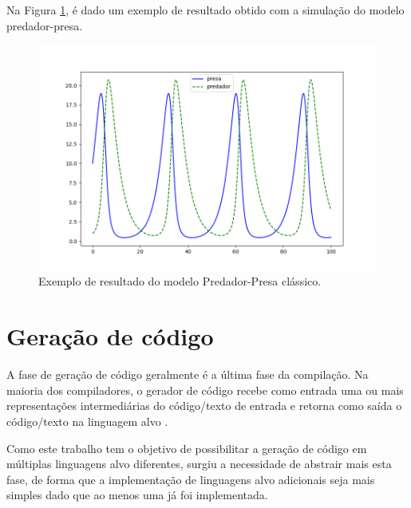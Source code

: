 \documentclass[
	12pt,				%
	openright,			%
	oneside,			%
	a4paper,			%
	main=brazil,
	english,			%
	]{ufsj-abntex2}
\begin{document}
Na Figura \ref{fig:hostprey}, é dado um exemplo de resultado obtido com a simulação do modelo predador-presa. 

\begin{figure}[h]
    \centering
    \includegraphics[scale=0.6]{imgs/hostprey.png} 
    \caption{Exemplo de resultado do modelo Predador-Presa clássico.}
    \label{fig:hostprey}
\end{figure}




\section{Geração de código}

A fase de geração de código geralmente é a última fase da compilação. Na maioria dos compiladores, o gerador de código recebe como entrada uma ou mais representações intermediárias do código/texto de entrada e retorna como saída o código/texto na linguagem alvo \cite{dragonBook}. 

Como este trabalho tem o objetivo de possibilitar a geração de código em múltiplas linguagens alvo diferentes, surgiu a necessidade de abstrair mais esta fase, de forma que a implementação de linguagens alvo adicionais seja mais simples dado que ao menos uma já foi implementada.
\end{document}
